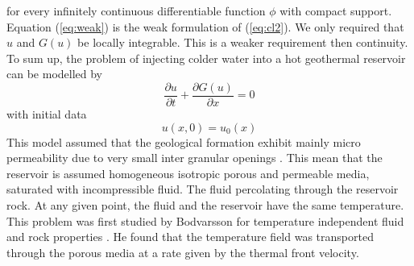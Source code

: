 for every infinitely continuous differentiable function $\phi$ with compact support. Equation (\ref{eq:weak}) is the weak formulation of (\ref{eq:cl2}). We only required that $u$ and $G(u)$ be locally integrable. This is a weaker requirement then continuity. To sum up, the problem of injecting colder water into a hot geothermal reservoir can be modelled by 
\begin{equation}\label{eq:cl3}
\frac{\partial u}{\partial t} +\frac{ \partial G(u) }{\partial x}=0			       
\end{equation}
with initial data
\begin{equation}\label{eq:i}
u(x,0)=u_{0}(x)						       
\end{equation}
This model assumed that the geological formation exhibit mainly micro permeability due to very small inter granular openings \cite{Bod-R72}. This mean that the reservoir is assumed homogeneous isotropic porous and permeable media, saturated with incompressible fluid. The fluid percolating through the reservoir rock. At any given point, the fluid and the reservoir have the same temperature.\\
This problem was first studied by Bodvarsson for temperature independent fluid and rock properties \cite{Bod-R72}. He found that the temperature field was transported through the porous media at a rate given by the thermal front velocity.







